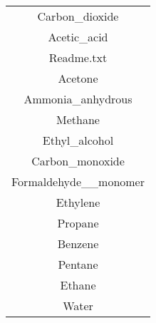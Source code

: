 \begin{tabular}{c}
\hline
Carbon_dioxide\\
Acetic_acid\\
Readme.txt\\
Acetone\\
Ammonia_anhydrous\\
Methane\\
Ethyl_alcohol\\
Carbon_monoxide\\
Formaldehyde__monomer\\
Ethylene\\
Propane\\
Benzene\\
Pentane\\
Ethane\\
Water\\
\hline
\end{tabular}
